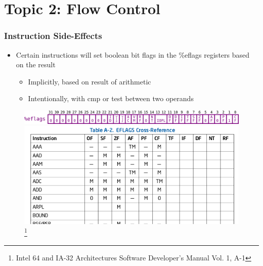 \documentclass[11pt,xcolor=dvipsnames]{beamer}
\newcommand{\vs}{\vspace{0.5em}}
\newcommand{\mvs}{\vspace{-0.95em}}
\begin{document}
\section{Topic 2: Flow Control}
\begin{frame}[fragile,t]
\mvs
\frametitle{Instruction Side-Effects}
\begin{itemize}
  \item Certain instructions will set boolean bit flags in the {\ttfamily \%eflags} registers based on the result
  \begin{itemize}
    \item Implicitly, based on result of arithmetic
    \item Intentionally, with {\ttfamily cmp} or {\ttfamily test} between two operands
  \end{itemize}
\end{itemize}
\mvs
\begin{figure}
\centering
  \includegraphics[width=\textwidth]{figures/eflags.png} \\
  \vs
  \includegraphics[height=0.4\paperheight]{figures/ia32-eflags.png}\footnote{Intel 64 and IA-32 Architectures Software Developer’s Manual Vol. 1, A-1}
\end{figure}
\end{frame}
\end{document}
